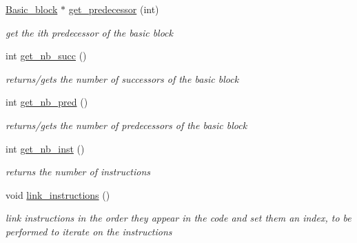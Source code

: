 \begin{DoxyCompactItemize}
\mbox{\label{class_basic__block_a5381da0d3cfdae07df433ffac3e8ebae}} 
\mbox{\hyperlink{class_basic__block}{Basic\+\_\+block}} $\ast$ \mbox{\hyperlink{class_basic__block_a5381da0d3cfdae07df433ffac3e8ebae}{get\+\_\+predecessor}} (int)
\begin{DoxyCompactList}\small\item\em get the ith predecessor of the basic block \end{DoxyCompactList}\item 
\mbox{\label{class_basic__block_a3ccc47a22b9d5d9e932862ab37783225}} 
int \mbox{\hyperlink{class_basic__block_a3ccc47a22b9d5d9e932862ab37783225}{get\+\_\+nb\+\_\+succ}} ()
\begin{DoxyCompactList}\small\item\em returns/gets the number of successors of the basic block \end{DoxyCompactList}\item 
\mbox{\label{class_basic__block_ade6f71459e5b54108022a16a4a6a00cb}} 
int \mbox{\hyperlink{class_basic__block_ade6f71459e5b54108022a16a4a6a00cb}{get\+\_\+nb\+\_\+pred}} ()
\begin{DoxyCompactList}\small\item\em returns/gets the number of predecessors of the basic block \end{DoxyCompactList}\item 
\mbox{\label{class_basic__block_ad3d770c77ba92d455fa3430df5f16eff}} 
int \mbox{\hyperlink{class_basic__block_ad3d770c77ba92d455fa3430df5f16eff}{get\+\_\+nb\+\_\+inst}} ()
\begin{DoxyCompactList}\small\item\em returns the number of instructions \end{DoxyCompactList}\item 
\mbox{\label{class_basic__block_ae53d18eb1436d162ee9ae565c46b35e5}} 
void \mbox{\hyperlink{class_basic__block_ae53d18eb1436d162ee9ae565c46b35e5}{link\+\_\+instructions}} ()
\begin{DoxyCompactList}\small\item\em link instructions in the order they appear in the code and set them an index, to be performed to iterate on the instructions \end{DoxyCompactList}\item 

\end{DoxyCompactItemize}
